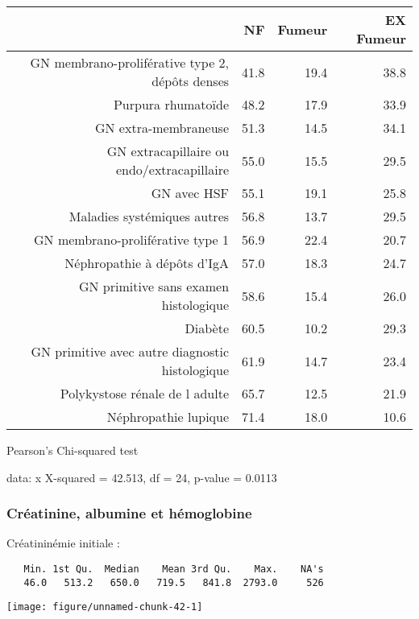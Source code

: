 \documentclass[11pt,a4paper]{article}\usepackage[]{graphicx}\usepackage[]{color}
\makeatletter
\def\maxwidth{ %
  \ifdim\Gin@nat@width>\linewidth
    \linewidth
  \else
    \Gin@nat@width
  \fi
}
\newenvironment{kframe}{%
 \def\at@end@of@kframe{}%
 \ifinner\ifhmode%
  \def\at@end@of@kframe{\end{minipage}}%
  \begin{minipage}{\columnwidth}%
 \fi\fi%
 \def\FrameCommand##1{\hskip\@totalleftmargin \hskip-\fboxsep
 \colorbox{shadecolor}{##1}\hskip-\fboxsep
     \hskip-\linewidth \hskip-\@totalleftmargin \hskip\columnwidth}%
 \MakeFramed {\advance\hsize-\width
   \@totalleftmargin\z@ \linewidth\hsize
   \@setminipage}}%
 {\par\unskip\endMakeFramed%
 \at@end@of@kframe}
\newenvironment{knitrout}{}{} %
\makeatother
\begin{document}
\begin{table}[H]
\centering
\begin{tabular}{rrrr}
  \hline
 & NF & Fumeur & EX Fumeur \\ 
  \hline
GN membrano-proliférative type 2, dépôts denses & 41.8 & 19.4 & 38.8 \\ 
  Purpura rhumatoïde & 48.2 & 17.9 & 33.9 \\ 
  GN extra-membraneuse & 51.3 & 14.5 & 34.1 \\ 
  GN extracapillaire ou endo/extracapillaire & 55.0 & 15.5 & 29.5 \\ 
  GN avec HSF & 55.1 & 19.1 & 25.8 \\ 
  Maladies systémiques autres & 56.8 & 13.7 & 29.5 \\ 
  GN membrano-proliférative type 1 & 56.9 & 22.4 & 20.7 \\ 
  Néphropathie à dépôts d'IgA & 57.0 & 18.3 & 24.7 \\ 
  GN primitive sans examen histologique & 58.6 & 15.4 & 26.0 \\ 
  Diabète & 60.5 & 10.2 & 29.3 \\ 
  GN primitive avec autre diagnostic histologique & 61.9 & 14.7 & 23.4 \\ 
  Polykystose rénale de l adulte & 65.7 & 12.5 & 21.9 \\ 
  Néphropathie lupique & 71.4 & 18.0 & 10.6 \\ 
   \hline
\end{tabular}
\end{table}

	Pearson's Chi-squared test

data:  x
X-squared = 42.513, df = 24, p-value = 0.0113



    \subsubsection{Créatinine, albumine et hémoglobine}

Créatininémie initiale :

\begin{knitrout}
\color{fgcolor}\begin{kframe}
\begin{verbatim}
   Min. 1st Qu.  Median    Mean 3rd Qu.    Max.    NA's 
   46.0   513.2   650.0   719.5   841.8  2793.0     526 
\end{verbatim}
\end{kframe}
\texttt{[image: figure/unnamed-chunk-42-1]} 

\end{knitrout}
\end{document}
